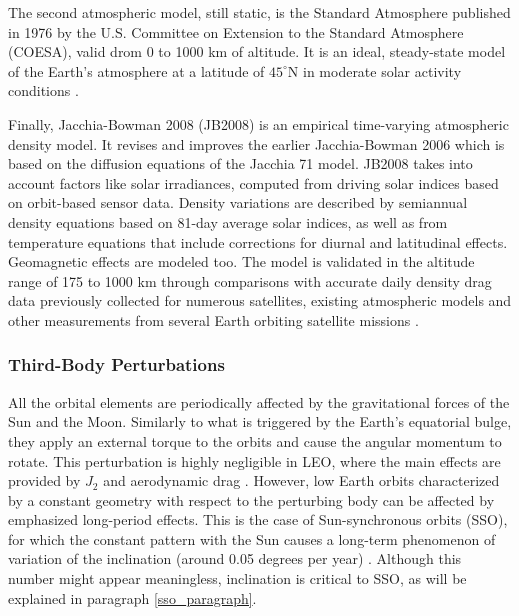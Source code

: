 The second atmospheric model, still static, is the Standard Atmosphere published in 1976 by the U.S. Committee on Extension to the Standard Atmosphere (COESA), valid drom 0 to 1000 km of altitude.
It is an ideal, steady-state model of the Earth's atmosphere at a latitude of $45^{\circ}$N in moderate solar activity conditions \cite{vallado2013fundamentals}.

Finally, Jacchia-Bowman 2008 (JB2008) is an empirical time-varying atmospheric density model. It revises and improves the earlier Jacchia-Bowman 2006 which is based on the diffusion equations of the Jacchia 71 model.
JB2008 takes into account factors like solar irradiances, computed from driving solar indices based on orbit-based sensor data.
Density variations are described by semiannual density equations based on 81-day average solar indices, as well as from temperature equations that include corrections for diurnal and latitudinal effects.
Geomagnetic effects are modeled too.
The model is validated in the altitude range of 175 to 1000 km through comparisons with accurate daily density drag data previously collected for numerous satellites, existing atmospheric models and other measurements from several Earth orbiting satellite missions \cite{bowman2008jb2006,bowman2008new}.

\subsubsection{Third-Body Perturbations}
All the orbital elements are periodically affected by the gravitational forces of the Sun and the Moon.
Similarly to what is triggered by the Earth's equatorial bulge, they apply an external torque to the orbits and cause the angular momentum to rotate.
This perturbation is highly negligible in LEO, where the main effects are provided by $J_2$ and aerodynamic drag \cite{wertz2009orbit}.
However, low Earth orbits characterized by a constant geometry with respect to the perturbing body can be affected by emphasized long-period effects.
This is the case of Sun-synchronous orbits (SSO), for which the constant pattern with the Sun causes a long-term phenomenon of variation of the inclination (around 0.05 degrees per year) \cite{giacaglia1994long}.
Although this number might appear meaningless, inclination is critical to SSO, as will be explained in paragraph \ref{sso_paragraph}.

